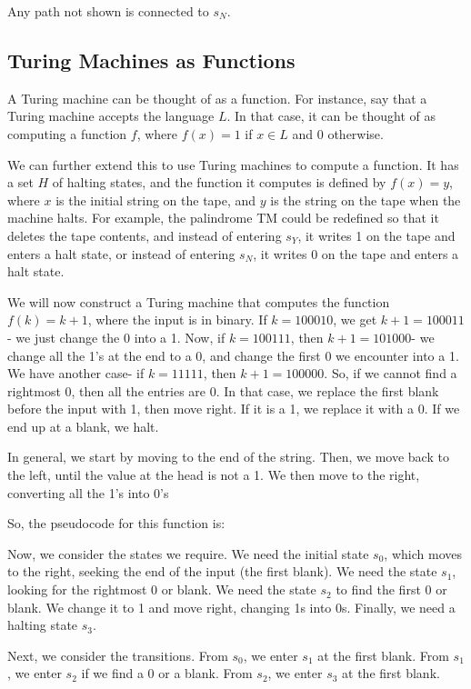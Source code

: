 \documentclass[a4paper, openany]{memoir}
\begin{document}
\noindent Any path not shown is connected to $s_N$.

\subsection{Turing Machines as Functions}
A Turing machine can be thought of as a function. For instance, say that a Turing machine accepts the language $L$. In that case, it can be thought of as computing a function $f$, where $f(x) = 1$ if $x \in L$ and $0$ otherwise.

We can further extend this to use Turing machines to compute a function. It has a set $H$ of halting states, and the function it computes is defined by $f(x) = y$, where $x$ is the initial string on the tape, and $y$ is the string on the tape when the machine halts. For example, the palindrome TM could be redefined so that it deletes the tape contents, and instead of entering $s_Y$, it writes 1 on the tape and enters a halt state, or instead of entering $s_N$, it writes 0 on the tape and enters a halt state.

We will now construct a Turing machine that computes the function $f(k) = k+1$, where the input is in binary. If $k = 100010$, we get $k+1 = 100011$- we just change the 0 into a 1. Now, if $k = 100111$, then $k+1 = 101000$- we change all the 1's at the end to a 0, and change the first 0 we encounter into a 1. We have another case- if $k = 11111$, then $k+1 = 100 000$. So, if we cannot find a rightmost 0, then all the entries are 0. In that case, we replace the first blank before the input with 1, then move right. If it is a 1, we replace it with a 0. If we end up at a blank, we halt.

In general, we start by moving to the end of the string. Then, we move back to the left, until the value at the head is not a 1. We then move to the right, converting all the 1's into 0's

So, the pseudocode for this function is:


Now, we consider the states we require. We need the initial state $s_0$, which moves to the right, seeking the end of the input (the first blank). We need the state $s_1$, looking for the rightmost 0 or blank. We need the state $s_2$ to find the first 0 or blank. We change it to 1 and move right, changing 1s into 0s. Finally, we need a halting state $s_3$.

Next, we consider the transitions. From $s_0$, we enter $s_1$ at the first blank. From $s_1$, we enter $s_2$ if we find a 0 or a blank. From $s_2$, we enter $s_3$ at the first blank.
\end{document}
